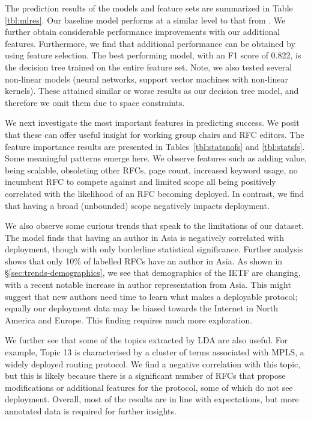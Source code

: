 \documentclass[twocolumn,10pt]{article}
\begin{document}
The prediction results of the models and feature sets are summarized in
Table \ref{tbl:mlres}. Our baseline model performs at a similar level to
that from \cite{nikkhah2017statistical}.  We further obtain considerable
performance improvements with our additional features. Furthermore, we find
that additional performance can be obtained by using feature selection.
The best performing model, with an F1 score of 0.822, is the decision tree
trained on the entire feature set.
Note, we also tested several non-linear models (neural networks, support
vector machines with non-linear kernels). These attained similar or worse
results as our decision tree model, and therefore we omit them due to space
constraints. 

We next investigate the most important features in predicting success.  We
posit that these can offer useful insight for working group chairs and RFC
editors.  The feature importance results are presented in
Tables~\ref{tbl:statsnofs} and \ref{tbl:statsfs}.  Some meaningful patterns
emerge here. We observe features such as adding value, being scalable,
obsoleting other RFCs, page count, increased keyword usage, no incumbent
RFC to compete against and limited scope all being positively correlated
with the likelihood of an RFC becoming deployed. In contrast, we find that
having a broad (unbounded) scope negatively impacts deployment.

We also observe some curious trends that speak to the limitations of our
dataset. The model finds that having an author in Asia is negatively
correlated with deployment, though with only borderline statistical
significance. Further analysis shows that only 10\% of labelled RFCs have
an author in Asia.  As shown in \S\ref{sec:trends-demographics}, we see
that demographics of the IETF are changing, with a recent notable increase
in author representation from Asia. This might suggest that new authors
need time to learn what makes a deployable protocol; equally our deployment
data may be biased towards the Internet in North America and Europe. This
finding requires much more exploration.

We further see that some of the topics extracted by LDA are also useful.
For example, Topic 13 is characterised by a cluster of terms associated
with MPLS, a widely deployed routing protocol. We find a negative
correlation with this topic, but this is likely because there is a
significant number of RFCs that propose modifications or additional
features for the protocol, some of which do not see deployment. Overall,
most of the results are in line with expectations, but more annotated data
is required for further insights.   
\end{document}
